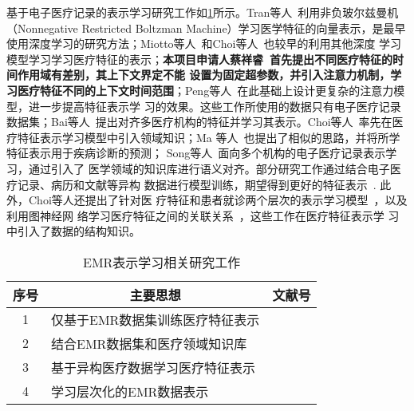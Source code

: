 基于电子医疗记录的表示学习研究工作如\cref{tab:representation}所示。Tran等人~利用非负玻尔兹曼机（Nonnegative Restricted Boltzman
Machine）学习医学特征的向量表示，是最早使用深度学习的研究方法；Miotto等人~和Choi等人~也较早的利用其他深度
学习模型学习学习医疗特征的表示；\textbf{本项目申请人蔡祥睿~首先提出不同医疗特征的时间作用域有差别，其上下文界定不能
设置为固定超参数，并引入注意力机制，学习医疗特征不同的上下文时间范围}；Peng等人~在此基础上设计更复杂的注意力模型，进一步提高特征表示学
习的效果。这些工作所使用的数据只有电子医疗记录数据集；Bai等人~提出对齐多医疗机构的特征并学习其表示。Choi等人~率先在医疗特征表示学习模型中引入领域知识；Ma
等人~也提出了相似的思路，并将所学特征表示用于疾病诊断的预测；
Song等人~面向多个机构的电子医疗记录表示学习，通过引入了
医学领域的知识库进行语义对齐。部分研究工作通过结合电子医疗记录、病历和文献等异构
数据进行模型训练，期望得到更好的特征表示~. 此外，Choi等人还提出了针对医
疗特征和患者就诊两个层次的表示学习模型~，以及利用图神经网
络学习医疗特征之间的关联关系~，这些工作在医疗特征表示学
习中引入了数据的结构知识。

\begin{table}
    \renewcommand\arraystretch{1.5}
    \begin{small}
        \caption{EMR表示学习相关研究工作}
        \label{tab:representation}
        \begin{center}
            \begin{tabular}[c]{cll}
                \toprule
                \multicolumn{1}{c}{\textbf{序号}} &
                \multicolumn{1}{c}{\textbf{主要思想}} &
                \multicolumn{1}{c}{\textbf{文献号}}\\
                \midrule
                1 & 仅基于EMR数据集训练医疗特征表示 & \cite{tran2015learning}
                \cite{miotto2016deep} \cite{choi2016medical}
                 \cite{cai2018medical} \cite{peng2019temporal}
                 \cite{bai2019medical}\\
                2 & 结合EMR数据集和医疗领域知识库 & \cite{choi2017gram}
                \cite{choi2018mime} \cite{ma2018kame} \cite{song2019medical}\\
                3 & 基于异构医疗数据学习医疗特征表示 & \cite{choi2016learning}
                \cite{bai2017joint} \cite{ma2018drug}\\
                4 & 学习层次化的EMR数据表示 & \cite{choi2016multi}
                \cite{choi2020learning}\\
                \bottomrule
            \end{tabular}
        \end{center}
    \end{small}
\end{table}

